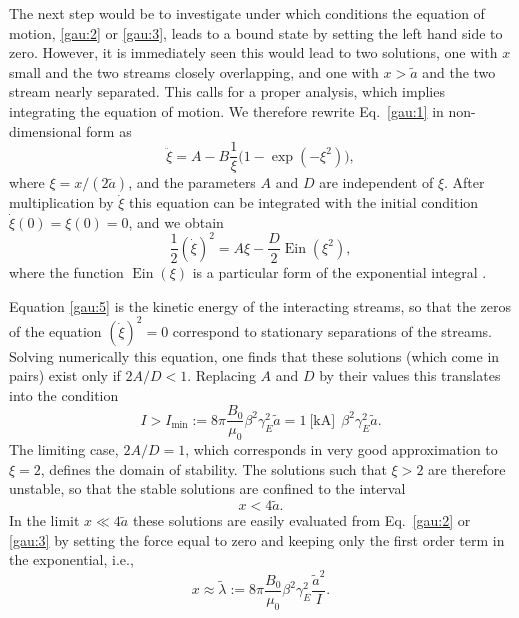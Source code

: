 \documentclass [12pt,a4paper,     ]{report} %
\newcommand{\DEF}{:=}                 %
\begin{document}
  The next step would be to investigate under which conditions the equation of motion, \eqref{gau:2} or \eqref{gau:3}, leads to a bound state by setting the left hand side to zero.  However, it is immediately seen this would lead to two solutions, one with $x$ small and the two streams closely overlapping, and one with $x > \tilde{a}$ and the two stream nearly separated.  This calls for a proper analysis, which implies integrating the equation of motion.  We therefore rewrite Eq.~\eqref{gau:1} in non-dimensional form as
%
\begin{equation}\label{gau:4} %
            \ddot{\xi} = A   -
            B\frac{1}{\xi}\bigl(1-\exp( -\xi^2)\bigr),
\end{equation}
%
where $\xi=x/(2\tilde{a})$, and the parameters $A$ and $D$ are independent of $\xi$.  After multiplication by $\dot\xi$ this equation can be integrated with the initial condition $\dot\xi(0)=\xi(0)=0$, and we obtain \cite{ZHANG1989-}
%
\begin{equation}\label{gau:5} %
       \frac{1}{2}(\dot\xi)^2 = A \xi - \frac{D}{2} \operatorname{Ein}(\xi^2),
\end{equation}
%
where the function $\operatorname{Ein}(\xi)$ is a particular form of the exponential integral \cite[p.228]{ABRAM1968-}.

   Equation \eqref{gau:5} is the kinetic energy of the interacting streams, so that the zeros of the equation $(\dot\xi)^2=0$ correspond to stationary separations of the streams.  Solving numerically this equation, one finds that these solutions (which come in pairs) exist only if $2A/D < 1$.  Replacing $A$ and $D$ by their values this translates into the condition
%
\begin{equation}\label{gau:6} %
      I > I_{\text{min}}
          \DEF 8 \pi \frac{B_0}{\mu_0} \beta^2\gamma^2_E \tilde{a}
            =  1~ \text{[kA]} ~~\beta^2\gamma^2_E \tilde{a}.
\end{equation}
%
The limiting case, $2A/D = 1$, which corresponds in very good approximation to $\xi = 2$, defines the domain of stability. The solutions such that $\xi > 2$ are therefore unstable, so that the stable solutions are confined to the interval
%
\begin{equation}\label{gau:7} %
         x < 4 \tilde{a}.
\end{equation}
%
In the limit $x \ll 4 \tilde{a}$ these solutions are easily evaluated from Eq.~\eqref{gau:2} or \eqref{gau:3} by setting the force equal to zero and keeping only the first order term in the exponential, i.e., 
%
\begin{equation}\label{gau:8} %
     x \approx \tilde{\lambda}
       \DEF  8 \pi \frac{B_0}{\mu_0} \beta^2\gamma^2_E \frac{\tilde{a}^2}{I}.
\end{equation}
%
\end{document}
